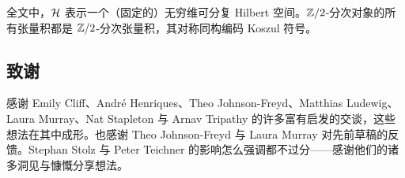 全文中，$\mathcal{H}$ 表示一个（固定的）无穷维可分复 Hilbert 空间。$\mathbb{Z}/2$-分次对象的所有张量积都是 $\mathbb{Z}/2$-分次张量积，其对称同构编码 Koszul 符号。

\subsection{致谢}
感谢 Emily Cliff、André Henriques、Theo Johnson-Freyd、Matthias Ludewig、Laura Murray、Nat Stapleton 与 Arnav Tripathy 的许多富有启发的交谈，这些想法在其中成形。也感谢 Theo Johnson-Freyd 与 Laura Murray 对先前草稿的反馈。Stephan Stolz 与 Peter Teichner 的影响怎么强调都不过分——感谢他们的诸多洞见与慷慨分享想法。
